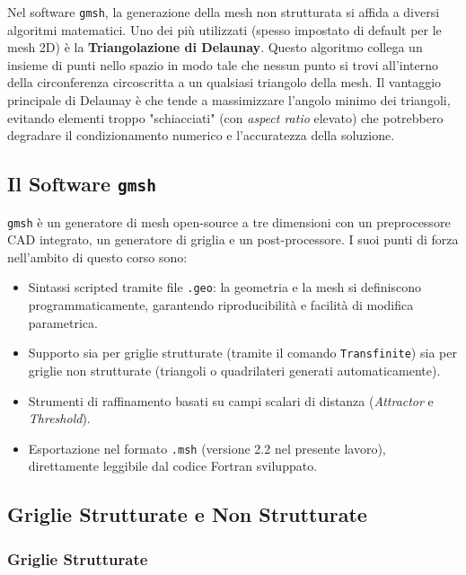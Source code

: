 Nel software \texttt{gmsh}, la generazione della mesh non strutturata si affida a diversi algoritmi matematici. Uno dei più utilizzati (spesso impostato di default per le mesh 2D) è la \textbf{Triangolazione di Delaunay}. Questo algoritmo collega un insieme di punti nello spazio in modo tale che nessun punto si trovi all'interno della circonferenza circoscritta a un qualsiasi triangolo della mesh. Il vantaggio principale di Delaunay è che tende a massimizzare l'angolo minimo dei triangoli, evitando elementi troppo "schiacciati" (con \textit{aspect ratio} elevato) che potrebbero degradare il condizionamento numerico e l'accuratezza della soluzione.

\subsection{Il Software \texttt{gmsh}}

\texttt{gmsh} è un generatore di mesh open-source a tre dimensioni con un preprocessore CAD
integrato, un generatore di griglia e un post-processore. I suoi punti di forza nell'ambito di
questo corso sono:
\begin{itemize}
  \item Sintassi scripted tramite file \texttt{.geo}: la geometria e la mesh si definiscono
    programmaticamente, garantendo riproducibilità e facilità di modifica parametrica.
  \item Supporto sia per griglie strutturate (tramite il comando \texttt{Transfinite}) sia per
    griglie non strutturate (triangoli o quadrilateri generati automaticamente).
  \item Strumenti di raffinamento basati su campi scalari di distanza (\textit{Attractor} e
    \textit{Threshold}).
  \item Esportazione nel formato \texttt{.msh} (versione 2.2 nel presente lavoro), direttamente
    leggibile dal codice Fortran sviluppato.
\end{itemize}

\subsection{Griglie Strutturate e Non Strutturate}
\label{sec:tipi_griglia}

\subsubsection{Griglie Strutturate}

